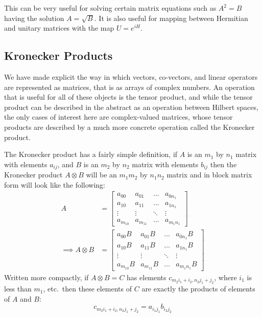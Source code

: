 This can be very useful for solving certain matrix equations such as $A^2 = B$ having the solution $A = \sqrt{B}$. It is also useful for mapping between Hermitian and unitary matrices with the map $U = e^{iH}$.

\subsection{Kronecker Products}
We have made explicit the way in which vectors, co-vectors, and linear operators are represented as matrices, that is as arrays of complex numbers. An operation that is useful for all of these objects is the tensor product, and while the tensor product can be described in the abstract as an operation between Hilbert spaces, the only cases of interest here are complex-valued matrices, whose tensor products are described by a much more concrete operation called the Kronecker product.

The Kronecker product has a fairly simple definition, if $A$ is an $m_1$ by $n_1$ matrix with elements $a_{ij}$, and $B$ is an $m_2$ by $n_2$ matrix with elements $b_{ij}$ then the Kronecker product $A \otimes B$ will be an $m_1m_2$ by $n_1n_2$ matrix and in block matrix form will look like the following:
\begin{align*}
	A &= \left[\begin{matrix}
		a_{00} & a_{01} & \dots & a_{0n_1}\\
		a_{10} & a_{11} & \dots & a_{1n_1}\\
		\vdots & \vdots & \ddots & \vdots\\
		a_{m_10} & a_{m_11} & \dots & a_{m_1n_1}
	\end{matrix}\right]
	\\\implies A\otimes B &= \left[\begin{matrix}
		a_{00}B & a_{01}B & \dots & a_{0n_1}B\\
		a_{10}B & a_{11}B & \dots & a_{1n_1}B\\
		\vdots & \vdots & \ddots & \vdots\\
		a_{m_10}B & a_{m_11}B & \dots & a_{m_1n_1}B
	\end{matrix}\right]
\end{align*}
Written more compactly, if $A\otimes B = C$ has elements $c_{m_2i_1 + i_2,n_2j_1+j_2}$, where $i_1$ is less than $m_1$, etc.\ then these elements of $C$ are exactly the products of elements of $A$ and $B$:
\[c_{m_2i_1 + i_2,n_2j_1+j_2} = a_{i_1j_1}b_{i_2j_2}\]


